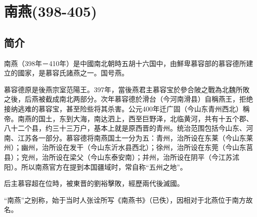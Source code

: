 

\section{南燕\tiny(398-405)}

\subsection{简介}

南燕（398年－410年）是中國南北朝時五胡十六国中，由鮮卑慕容部的慕容德所建立的國家，是慕容氏諸燕之一。国号燕。

慕容德原是後燕宗室范陽王。397年，當後燕君主慕容宝於參合陂之戰為北魏所敗之後，后燕被截成南北两部分。次年慕容德於滑台（今河南滑县）自稱燕王，拒绝接纳逃难的慕容宝，甚至险些将其杀害。公元400年迁广固（今山东青州西北）稱帝。南燕的国土，东到大海，南达泗上，西至巨野泽，北临黄河，共有十五个郡、八十二个县，约三十三万户，基本上就是原西晋的青州。统治范围包括今山东、河南、江苏各一部分。慕容德将南燕国土一分为五：青州，治所设在东莱（今山东莱州）；幽州，治所设在发干（今山东沂水县西北）；徐州，治所设在东莞（今山东莒县）；兖州，治所设在梁父（今山东泰安南）；并州，治所设在阴平（今江苏沭阳）。所以南燕官方在提到本国疆域时，常自称“五州之地”。

后主慕容超在位時，被東晋的劉裕擊敗，經歷兩代後滅國。

“南燕”之别称，始于当时人张诠所写《南燕书》（已佚），因相对于北燕位于南方故名。





